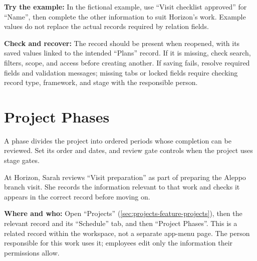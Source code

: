 \textbf{Try the example:} In the fictional example, use “Visit checklist approved” for “Name”, then complete the other information to suit Horizon's work. Example values do not replace the actual records required by relation fields.

\textbf{Check and recover:} The record should be present when reopened, with its saved values linked to the intended “Plans” record. If it is missing, check search, filters, scope, and access before creating another. If saving fails, resolve required fields and validation messages; missing tabs or locked fields require checking record type, framework, and stage with the responsible person.

\clearpage
\section{Project Phases}
\label{sec:projects-feature-phases}

A phase divides the project into ordered periods whose completion can be reviewed. Set its order and dates, and review gate controls when the project uses stage gates.

\begin{rcnote}
At Horizon, Sarah reviews “Visit preparation” as part of preparing the Aleppo branch visit. She records the information relevant to that work and checks it appears in the correct record before moving on.
\end{rcnote}

\textbf{Where and who:} Open “Projects” (\ref{sec:projects-feature-projects}), then the relevant record and its “Schedule” tab, and then “Project Phases”. This is a related record within the workspace, not a separate app-menu page. The person responsible for this work uses it; employees edit only the information their permissions allow.

